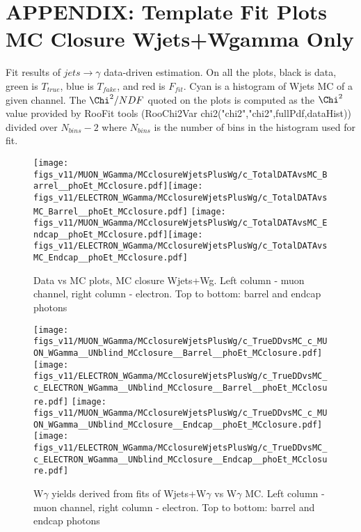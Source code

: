 \section{APPENDIX: Template Fit Plots MC Closure Wjets+Wgamma Only}
\label{sec:TemplateFitPlotsMCclosureWjetsPlusWg}

Fit results of $jets \rightarrow \gamma$ data-driven estimation. On all the plots, black is data, green is $T_{true}$, blue is $T_{fake}$, and red is $F_{fit}$. Cyan is a histogram of Wjets MC of a given channel. The $\Chi^2/{NDF}$ quoted on the plots is computed as the $\Chi^2$ value provided by RooFit tools (RooChi2Var chi2("chi2","chi2",fullPdf,dataHist)) divided over $N_{bins}-2$ where $N_{bins}$ is the number of bins in the histogram used for fit.

 \begin{figure}[htb]
  \begin{center}
   \texttt{[image: figs\_v11/MUON\_WGamma/MCclosureWjetsPlusWg/c\_TotalDATAvsMC\_Barrel\_\_phoEt\_MCclosure.pdf]}\texttt{[image: figs\_v11/ELECTRON\_WGamma/MCclosureWjetsPlusWg/c\_TotalDATAvsMC\_Barrel\_\_phoEt\_MCclosure.pdf]}
   \texttt{[image: figs\_v11/MUON\_WGamma/MCclosureWjetsPlusWg/c\_TotalDATAvsMC\_Endcap\_\_phoEt\_MCclosure.pdf]}\texttt{[image: figs\_v11/ELECTRON\_WGamma/MCclosureWjetsPlusWg/c\_TotalDATAvsMC\_Endcap\_\_phoEt\_MCclosure.pdf]}
  \caption{Data vs MC plots, MC closure Wjets+Wg. Left column - muon channel, right column - electron. Top to bottom: barrel and endcap photons}
  \label{fig:DATAvsMC_MCclosureWjetsPlusWg}
  \end{center}
\end{figure}

 \begin{figure}[htb]
  \begin{center}
   \texttt{[image: figs\_v11/MUON\_WGamma/MCclosureWjetsPlusWg/c\_TrueDDvsMC\_c\_MUON\_WGamma\_\_UNblind\_MCclosure\_\_Barrel\_\_phoEt\_MCclosure.pdf]}\texttt{[image: figs\_v11/ELECTRON\_WGamma/MCclosureWjetsPlusWg/c\_TrueDDvsMC\_c\_ELECTRON\_WGamma\_\_UNblind\_MCclosure\_\_Barrel\_\_phoEt\_MCclosure.pdf]}
   \texttt{[image: figs\_v11/MUON\_WGamma/MCclosureWjetsPlusWg/c\_TrueDDvsMC\_c\_MUON\_WGamma\_\_UNblind\_MCclosure\_\_Endcap\_\_phoEt\_MCclosure.pdf]}\texttt{[image: figs\_v11/ELECTRON\_WGamma/MCclosureWjetsPlusWg/c\_TrueDDvsMC\_c\_ELECTRON\_WGamma\_\_UNblind\_MCclosure\_\_Endcap\_\_phoEt\_MCclosure.pdf]}
  \caption{W$\gamma$ yields derived from fits of Wjets+W$\gamma$ vs W$\gamma$ MC. Left column - muon channel, right column - electron. Top to bottom: barrel and endcap photons}
  \label{fig:TrueDDvsMC_MCclosureWjetsPlusWg}
  \end{center}
\end{figure}


